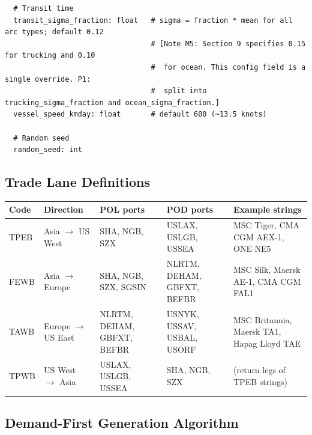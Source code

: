 \documentclass[11pt,a4paper]{article}
\theoremstyle{definition}
\begin{document}
\begin{verbatim}
  # Transit time
  transit_sigma_fraction: float   # sigma = fraction * mean for all arc types; default 0.12
                                  # [Note M5: Section 9 specifies 0.15 for trucking and 0.10
                                  #  for ocean. This config field is a single override. P1:
                                  #  split into trucking_sigma_fraction and ocean_sigma_fraction.]
  vessel_speed_kmday: float       # default 600 (~13.5 knots)

  # Random seed
  random_seed: int
\end{verbatim}

\subsection{Trade Lane Definitions}

\begin{center}
\begin{tabular}{lllll}
\toprule
Code & Direction & POL ports & POD ports & Example strings \\
\midrule
TPEB & Asia $\to$ US West & SHA, NGB, SZX & USLAX, USLGB, USSEA & MSC Tiger, CMA CGM AEX-1, ONE NE5 \\
FEWB & Asia $\to$ Europe & SHA, NGB, SZX, SGSIN & NLRTM, DEHAM, GBFXT, BEFBR & MSC Silk, Maersk AE-1, CMA CGM FAL1 \\
TAWB & Europe $\to$ US East & NLRTM, DEHAM, GBFXT, BEFBR & USNYK, USSAV, USBAL, USORF & MSC Britannia, Maersk TA1, Hapag Lloyd TAE \\
TPWB & US West $\to$ Asia & USLAX, USLGB, USSEA & SHA, NGB, SZX & (return legs of TPEB strings) \\
\bottomrule
\end{tabular}
\end{center}

\subsection{Demand-First Generation Algorithm}
\end{document}
